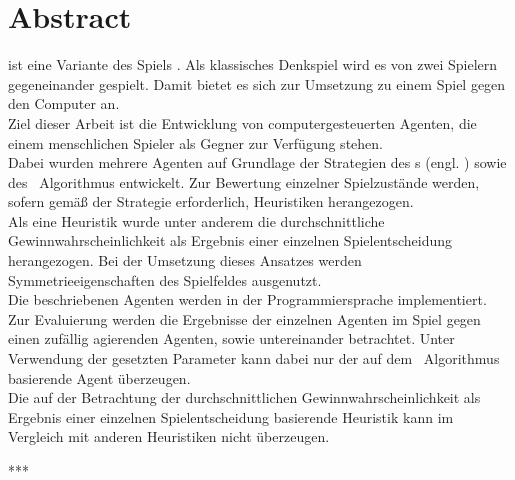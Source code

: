 \chapter*{Abstract}
\mxZitat{\ot} ist eine Variante des Spiels . Als klassisches Denkspiel wird es von zwei Spielern gegeneinander gespielt. Damit bietet es sich zur Umsetzung zu einem Spiel gegen den Computer an.
\\Ziel dieser Arbeit ist die Entwicklung von computergesteuerten Agenten, die einem menschlichen Spieler als Gegner zur Verfügung stehen.
\\Dabei wurden mehrere Agenten auf Grundlage der Strategien des \abab s (engl. \mxZitat{\abp}) sowie des \mc\ Algorithmus entwickelt. Zur Bewertung einzelner Spielzustände werden, sofern gemäß der Strategie erforderlich, Heuristiken herangezogen.
\\Als eine Heuristik wurde unter anderem die durchschnittliche Gewinnwahrscheinlichkeit als Ergebnis einer einzelnen Spielentscheidung herangezogen. Bei der Umsetzung dieses Ansatzes werden Symmetrieeigenschaften des Spielfeldes ausgenutzt.
\\Die beschriebenen Agenten werden in der Programmiersprache  implementiert.
\\Zur Evaluierung werden die Ergebnisse der einzelnen Agenten im Spiel gegen einen zufällig agierenden Agenten, sowie untereinander betrachtet. Unter Verwendung der gesetzten Parameter kann dabei nur der auf dem \mc\ Algorithmus basierende Agent überzeugen.
\\Die auf der Betrachtung der durchschnittlichen Gewinnwahrscheinlichkeit als Ergebnis einer einzelnen Spielentscheidung basierende Heuristik kann im Vergleich mit anderen Heuristiken nicht überzeugen.

\begin{center}
***
\end{center}